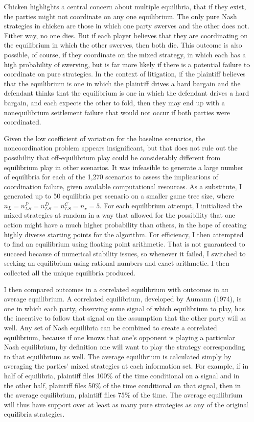 \documentclass{article}
\begin{document}
Chicken highlights a central concern about multiple equilibria, that if they exist, the parties might not coordinate on any one equilibrium. The only pure Nash strategies in chicken are those in which one party swerves and the other does not. Either way, no one dies. But if each player believes that they are coordinating on the equilibrium in which the other swerves, then both die. This outcome is also possible, of course, if they coordinate on the mixed strategy, in which each has a high probability of swerving, but is far more likely if there is a potential failure to coordinate on pure strategies. In the context of litigation, if the plaintiff believes that the equilibrium is one in which the plaintiff drives a hard bargain and the defendant thinks that the equilibrium is one in which the defendant drives a hard bargain, and each expects the other to fold, then they may end up with a nonequilibrium settlement failure that would not occur if both parties were coordinated.

Given the low coefficient of variation for the baseline scenarios, the noncoordination problem appears insignificant, but that does not rule out the possibility that off-equilibrium play could be considerably different from equilibrium play in other scenarios.  It was infeasible to generate a large number of equilibria for each of the 1,270 scenarios to assess the implications of coordination failure, given available computational resources. As a substitute, I generated up to 50 equilibria per scenario on a smaller game tree size, where $n_{L}=n_{LS}^P=n_{LS}^D=n_{LS}^C=n_{\mathcal{o}}=5$. For each equilibrium attempt, I initialized the mixed strategies at random in a way that allowed for the possibility that one action might have a much higher probability than others, in the hope of creating highly diverse starting points for the algorithm. For efficiency, I then attempted to find an equilibrium using floating point arithmetic. That is not guaranteed to succeed because of numerical stability issues, so whenever it failed, I switched to seeking an equilibrium using rational numbers and exact arithmetic. I then collected all the unique equilibria produced. 

I then compared outcomes in a correlated equilibrium with outcomes in an average equilibrium. A correlated equilibrium, developed by Aumann (1974), is one in which each party, observing some signal of which equilibrium to play, has the incentive to follow that signal on the assumption that the other party will as well. Any set of Nash equilibria can be combined to create a correlated equilibrium, because if one knows that one's opponent is playing a particular Nash equilibrium, by definition one will want to play the strategy corresponding to that equilibrium as well. The average equilibrium is calculated simply by averaging the parties' mixed strategies at each information set. For example, if in half of equilibria, plaintiff files 100\% of the time conditional on a signal and in the other half, plaintiff files 50\% of the time conditional on that signal, then in the average equilibrium, plaintiff files 75\% of the time. The average equilibrium will thus have support over at least as many pure strategies as any of the original equilibria strategies. 
\end{document}

